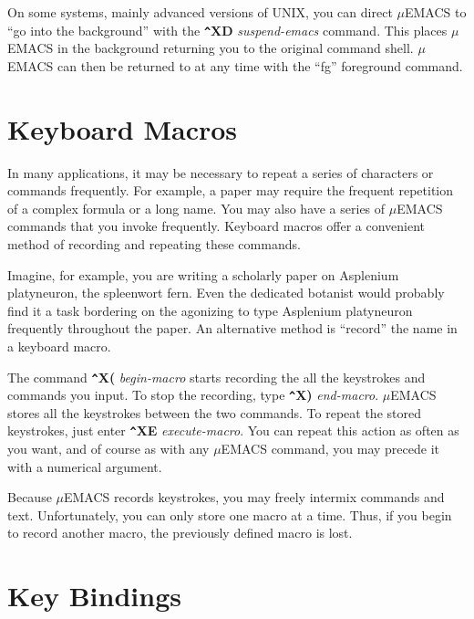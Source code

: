 On some systems, mainly advanced versions of UNIX, you can direct
$\mu$EMACS to ``go into the background'' with the {\bf \verb+^+XD} {\it
suspend-emacs} command. This places $\mu$EMACS in the background
returning you to the original command shell. $\mu$EMACS can then be
returned to at any time with the ``fg'' foreground command.
\chapter{Keyboard Macros}

In many applications, it may be necessary to repeat a series of
characters or commands frequently. For example, a paper may require the
frequent repetition of a complex formula or a long name. You may also
have a series of $\mu$EMACS commands that you invoke frequently.
Keyboard macros offer a convenient method of recording and repeating
these commands.

Imagine, for example, you are writing a scholarly paper on Asplenium
platyneuron, the spleenwort fern. Even the dedicated botanist would
probably find it a task bordering on the agonizing to type Asplenium
platyneuron frequently throughout the paper. An alternative method is
``record'' the name in a keyboard macro.


The command {\bf \verb+^+X(} {\it begin-macro} starts recording the all
the keystrokes and commands you input. To stop the recording, type {\bf
\verb+^+X)} {\it end-macro}. $\mu$EMACS stores all the keystrokes
between the two commands. To repeat the stored keystrokes, just enter
{\bf \verb+^+XE} {\it execute-macro}. You can repeat this action as
often as you want, and of course as with any $\mu$EMACS command, you
may precede it with a numerical argument.

Because $\mu$EMACS records keystrokes, you may freely intermix commands
and text. Unfortunately, you can only store one macro at a time. Thus,
if you begin to record another macro, the previously defined macro is
lost.
\chapter{Key Bindings}

